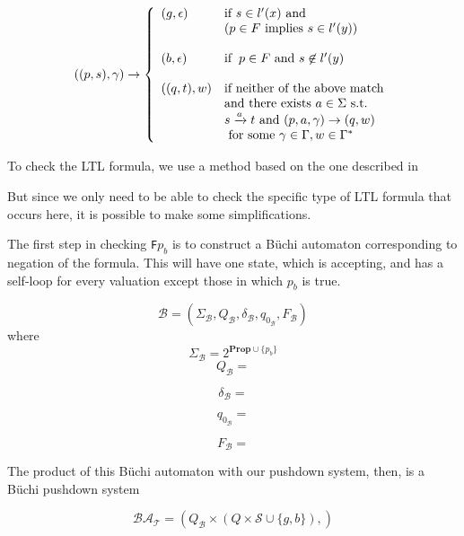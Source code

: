 \documentclass[11pt]{article}
\theoremstyle{definition}
\begin{document}
{\begin{displaymath}
   ((p,s),\gamma) \rightarrow \left\{
     \begin{array}{ll}
       (g, \epsilon) & \text{if } s \in l'(x) \text{ and} \\
                     & (p \in F \text{ implies } s \in l'(y)) \\
       & \\
       (b, \epsilon) & \text{if}  \hspace{2mm} p \in F \text{ and } s \not \in l'(y) \\
       & \\
       ((q,t),w)     & \text{if neither of the above match} \\
                     & \text{and there exists } a \in \Sigma \text{ s.t. } \\
                     & s \xrightarrow{a} t \text{ and } (p, a, \gamma) \rightarrow (q, w) \\
                     & \text{ for some } \gamma \in \Gamma, w \in \Gamma^*
     \end{array}
   \right.
\end{displaymath}


To check the LTL formula, we use a method based on the one described in \cite{EHRS00b} %

But since we only need to be able to check the specific type of LTL formula
that occurs here, it is possible to make some simplifications.

The first step in checking \texttt{F}$p_b$ is to construct a B\"{u}chi automaton
corresponding to negation of the formula. This will have one state, which is
accepting, and has a self-loop for every valuation except those in which $p_b$ is
true. 

\[ 
\mathcal{B} = (\Sigma_\mathcal{B}, Q_\mathcal{B}, \delta_\mathcal{B}, q_{0_\mathcal{B}}, F_\mathcal{B})
\]
where
\[ \Sigma_\mathcal{B} = 2^{\textbf{Prop}\cup\{p_b\}} \]
\[ Q_\mathcal{B} = \] %

\[ \delta_\mathcal{B} = \]

\[ q_{0_\mathcal{B}} = \]

\[ F_\mathcal{B} =  \]


The product of this B\"{u}chi automaton with our pushdown system, then, is a B\"{u}chi pushdown system 

\[ 
\mathcal{BA_T} = ( Q_\mathcal{B} \times (Q \times \mathcal{S} \cup \{g, b\}) , ) %
\]



}
\end{document}
